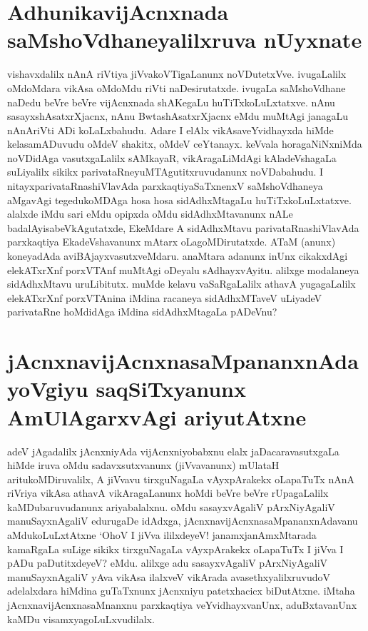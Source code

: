\section*{AdhunikavijAcnxnada saMshoVdhaneyalilxruva nUyxnate}

vishavxdalilx nAnA riVtiya jiVvakoVTigaLanunx noVDutetxVve. ivugaLalilx oMdoMdara vikAsa oMdoMdu riVti naDesirutatxde. ivugaLa saMshoVdhane naDedu beVre beVre vijAcnxnada shAKegaLu huTiTxkoLuLxtatxve. nAnu sasayxshAsatxrXjacnx, nAnu BwtashAsatxrXjacnx eMdu muMtAgi janagaLu nAnAriVti ADi koLaLxbahudu. Adare I elAlx vikAsaveYvidhayxda hiMde kelasamADuvudu oMdeV shakitx, oMdeV ceYtanayx. keVvala horagaNiNxniMda noVDidAga vasutxgaLalilx sAMkayaR, vikAragaLiMdAgi kAladeVshagaLa suLiyalilx sikikx parivataRneyuMTAgutitxruvudanunx noVDabahudu. I nitayxparivataRnashiVlavAda parxkaqtiyaSaTxnenxV saMshoVdhaneya aMgavAgi tegedukoMDAga hosa hosa sidAdhxMtagaLu huTiTxkoLuLxtatxve. alalxde iMdu sari eMdu opipxda oMdu sidAdhxMtavanunx nALe badalAyisabeVkAgutatxde, EkeMdare A sidAdhxMtavu parivataRnashiVlavAda parxkaqtiya EkadeVshavanunx mAtarx oLagoMDirutatxde. ATaM (anunx) koneyadAda aviBAjayxvasutxveMdaru. anaMtara adanunx inUnx cikakxdAgi elekATxrXnf porxVTAnf muMtAgi oDeyalu sAdhayxvAyitu. alilxge modalaneya sidAdhxMtavu uruLibitutx. muMde kelavu vaSaRgaLalilx athavA yugagaLalilx elekATxrXnf porxVTAnina iMdina racaneya sidAdhxMTaveV uLiyadeV parivataRne hoMdidAga iMdina sidAdhxMtagaLa pADeVnu?

\section*{jAcnxnavijAcnxnasaMpananxnAda yoVgiyu saqSiTxyanunx AmUlAgarxvAgi ariyutAtxne}

adeV jAgadalilx jAcnxniyAda vijAcnxniyobabxnu elalx jaDacaravasutxgaLa hiMde iruva oMdu sadavxsutxvanunx (jiVvavanunx) mUlataH aritukoMDiruvalilx, A jiVvavu tirxguNagaLa vAyxpArakekx oLapaTuTx nAnA riVriya vikAsa athavA vikAragaLanunx hoMdi beVre beVre rUpagaLalilx kaMDubaruvudanunx ariyabalalxnu. oMdu sasayxvAgaliV pArxNiyAgaliV manuSayxnAgaliV edurugaDe idAdxga, jAcnxnavijAcnxnasaMpananxnAdavanu aMdukoLuLxtAtxne `OhoV I jiVva ililxdeyeV! janamxjanAmxMtarada kamaRgaLa suLige sikikx  tirxguNagaLa vAyxpArakekx oLapaTuTx I jiVva I pADu paDutitxdeyeV? eMdu. alilxge adu sasayxvAgaliV pArxNiyAgaliV manuSayxnAgaliV yAva vikAsa ilalxveV vikArada avasethxyalilxruvudoV adelalxdara hiMdina guTaTxnunx jAcnxniyu patetxhacicx biDutAtxne. iMtaha jAcnxnavijAcnxnasaMnanxnu parxkaqtiya veYvidhayxvanUnx, aduBxtavanUnx kaMDu visamxyagoLuLxvudilalx.

